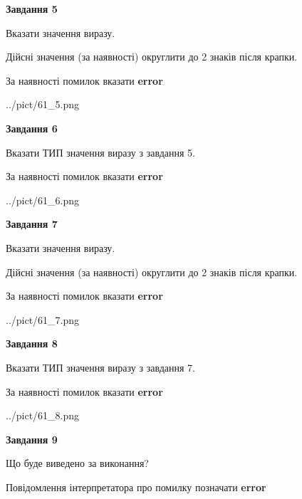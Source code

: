 \documentclass[11pt, ukrainian]{article}
\begin{document}
{\begin {large}
{\begin {center}\textbf{Завдання 5}\end {center}}\par
Вказати значення виразу. \par
Дійсні значення (за наявності) округлити до 2 знаків після крапки. \par
За наявності помилок вказати \textbf{error}

\begin{center}
	{../pict/61_5.png}
\end{center}
\newpage

{\begin {center}\textbf{Завдання 6}\end {center}}\par
Вказати ТИП значення виразу з завдання 5. \par
За наявності помилок вказати \textbf{error}

\begin{center}
	{../pict/61_6.png}
\end{center}
\newpage

{\begin {center}\textbf{Завдання 7}\end {center}}\par
Вказати значення виразу. \par
Дійсні значення (за наявності) округлити до 2 знаків після крапки. \par
За наявності помилок вказати \textbf{error}

\begin{center}
	{../pict/61_7.png}
\end{center}
\newpage

{\begin {center}\textbf{Завдання 8}\end {center}}\par
Вказати ТИП значення виразу з завдання 7. \par
За наявності помилок вказати \textbf{error}

\begin{center}
	{../pict/61_8.png}
\end{center}
\newpage

{\begin {center}\textbf{Завдання 9}\end {center}}\par
Що буде виведено за виконання? \par
Повідомлення інтерпретатора про помилку позначати \textbf{error}


\end{large}}
\end{document}
